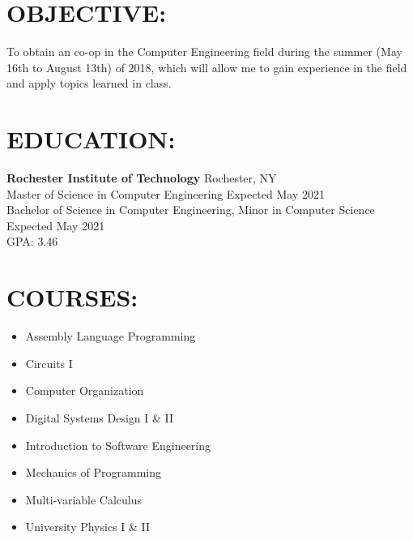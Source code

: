 \documentclass[line,margin]{res}
\begin{document}
\setlength\columnsep{-30pt}
\email{} %
\phone{} %
\address{} %
\address{} %
\website{} %

\begin{resume}
 \setlength
 \multicolsep{2pt}

\section{OBJECTIVE:} %
	To obtain an co-op in the Computer Engineering field during the summer (May 16th to August 13th) of 2018, which will allow me to gain experience in the field and apply topics learned in class.

\section{EDUCATION:} 
	\textbf{Rochester Institute of Technology} \hfill Rochester, NY \\
	Master of Science in Computer Engineering \hfill Expected May 2021 \\
	Bachelor of Science in Computer Engineering, Minor in Computer Science \hfill Expected May 2021\\ 
	GPA: 3.46

\section{COURSES:}
		\begin{multicols}{2}
		\setlength\columnsep{1pt}
			\begin{itemize}
				\setlength{\itemindent}{-25pt}
				\item[] Assembly Language Programming
				\item[] Circuits I
				\item[] Computer Organization
				\item[] Digital Systems Design I \& II
				\item[] \hspace{12.5pt} Introduction to Software Engineering
				\item[] \hspace{12.5pt} Mechanics of Programming
				\item[] \hspace{12.5pt} Multi-variable Calculus
				\item[] \hspace{12.5pt} University Physics I \& II
			\end{itemize}
		\end{multicols}


\end{resume}
\end{document}
